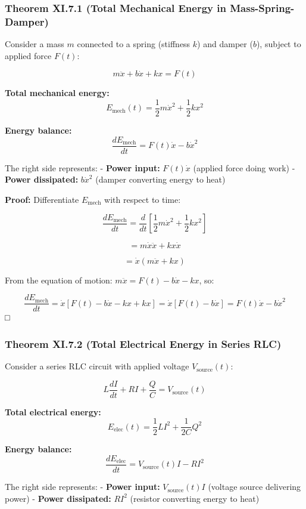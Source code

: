 \documentclass[
]{article}
\begin{document}
\subsubsection{Theorem XI.7.1 (Total Mechanical Energy in
Mass-Spring-Damper)}\label{theorem-xi.7.1-total-mechanical-energy-in-mass-spring-damper}

Consider a mass \(m\) connected to a spring (stiffness \(k\)) and damper
(\(b\)), subject to applied force \(F(t)\):

\[m\ddot{x} + b\dot{x} + kx = F(t)\]

\textbf{Total mechanical energy:}
\[E_{\text{mech}}(t) = \frac{1}{2}m\dot{x}^2 + \frac{1}{2}kx^2\]

\textbf{Energy balance:}
\[\frac{dE_{\text{mech}}}{dt} = F(t)\dot{x} - b\dot{x}^2\]

The right side represents: - \textbf{Power input:} \(F(t)\dot{x}\)
(applied force doing work) - \textbf{Power dissipated:} \(b\dot{x}^2\)
(damper converting energy to heat)

\textbf{Proof:} Differentiate \(E_{\text{mech}}\) with respect to time:

\[\frac{dE_{\text{mech}}}{dt} = \frac{d}{dt}\left[\frac{1}{2}m\dot{x}^2 + \frac{1}{2}kx^2\right]\]

\[= m\dot{x}\ddot{x} + kx\dot{x}\]

\[= \dot{x}(m\ddot{x} + kx)\]

From the equation of motion: \(m\ddot{x} = F(t) - b\dot{x} - kx\), so:

\[\frac{dE_{\text{mech}}}{dt} = \dot{x}[F(t) - b\dot{x} - kx + kx] = \dot{x}[F(t) - b\dot{x}] = F(t)\dot{x} - b\dot{x}^2\]
□

\subsubsection{Theorem XI.7.2 (Total Electrical Energy in Series
RLC)}\label{theorem-xi.7.2-total-electrical-energy-in-series-rlc}

Consider a series RLC circuit with applied voltage
\(V_{\text{source}}(t)\):

\[L\frac{dI}{dt} + RI + \frac{Q}{C} = V_{\text{source}}(t)\]

\textbf{Total electrical energy:}
\[E_{\text{elec}}(t) = \frac{1}{2}LI^2 + \frac{1}{2C}Q^2\]

\textbf{Energy balance:}
\[\frac{dE_{\text{elec}}}{dt} = V_{\text{source}}(t) I - RI^2\]

The right side represents: - \textbf{Power input:}
\(V_{\text{source}}(t) I\) (voltage source delivering power) -
\textbf{Power dissipated:} \(RI^2\) (resistor converting energy to heat)
\end{document}
